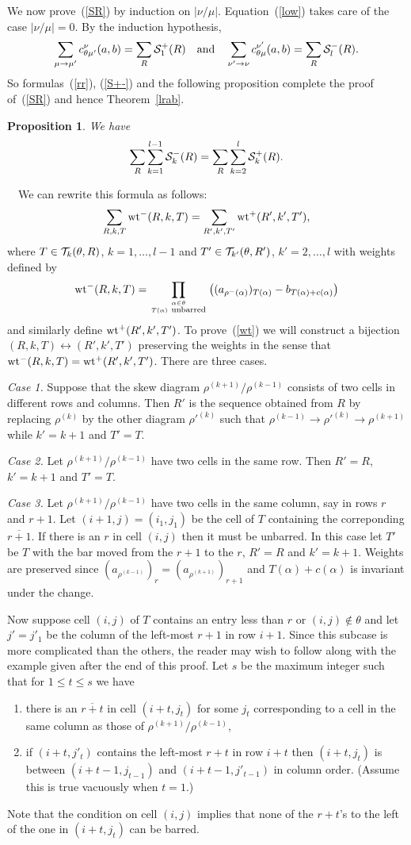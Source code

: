 \documentclass[titlepage,12pt]{article}
\newcommand{\ben}{\begin{enumerate}}
\newcommand{\een}{\end{enumerate}}
\newcommand{\bpr}{\begin{prop}}
\newcommand{\epr}{\end{prop}}
\newcommand{\beq}{\begin{equation}}
\newcommand{\eeq}{\end{equation}}
\newcommand{\ol}{\overline}
\newcommand{\qmq}[1]{\quad\mbox{#1}\quad}
\newcommand{\al}{\alpha}
\renewcommand{\th}{\theta}
\newcommand{\0}{{\bf 0}}
\newcommand{\1}{{\bf 1}}
\newcommand{\2}{{\bf 2}}
\newcommand{\3}{{\bf 3}}
\newcommand{\4}{{\bf 4}}
\newcommand{\5}{{\bf 5}}
\newcommand{\6}{{\bf 6}}
\newcommand{\7}{{\bf 7}}
\newcommand{\8}{{\bf 8}}
\newcommand{\9}{{\bf 9}}
\newcommand{\cS}{{\cal S}}
\newcommand{\cT}{{\cal T}}
\newcommand{\wt}{\mathop{\rm wt}\nolimits}
\newcommand{\Proof}{\noindent{\bf Proof.}\ \ }
\newtheorem{prop}[thm]{Proposition}
\begin{document}
We now prove~(\ref{SR}) by induction on $|\nu/\mu|$.
Equation~(\ref{low}) takes care of the case $|\nu/\mu|=0$.
By the induction hypothesis,
$$
\sum_{\mu\to\mu'}c_{\theta\mu'}^{\nu}(a,b)=\sum_R \cS_1^{+}(R)
\qmq{and}
\sum_{\nu'\to\nu}c_{\theta\mu}^{\nu'}(a,b)=\sum_R \cS_l^{-}(R).
$$
So formulas~(\ref{rr}), (\ref{S+-}) and 
the following proposition complete the proof of~(\ref{SR}) and hence
Theorem~\ref{lrab}. 

\bpr
We have
$$
\sum_R \sum_{k=1}^{l-1}\cS_k^{-}(R)=\sum_R \sum_{k=2}^l\cS_k^{+}(R).
$$
\epr

\Proof We can rewrite this formula as follows:
\beq						\label{wt}
\sum_{R,k,T}\wt^{-}(R,k,T)=\sum_{R',k',T'}\wt^{+}(R',k',T'),
\eeq
where $T\in\cT_k(\theta,R)$, $k=1,\dots,l-1$ and
$T'\in\cT_{k'}(\theta,R')$, $k'=2,\dots,l$ with weights defined by
$$
\wt^-(R,k,T)=
\prod_{\alpha\in\theta\atop T(\alpha)\ \mbox{\scriptsize unbarred}}
\left((a_{\rho^{-}(\alpha)})_{T(\alpha)}-b_{T(\alpha)+c(\alpha)}\right)
$$
and similarly define $\wt^+(R',k',T')$.  To prove~(\ref{wt})
we will construct a bijection $(R,k,T)\longleftrightarrow (R',k',T')$
preserving the weights in the sense that
$\wt^{-}(R,k,T)=\wt^{+}(R',k',T')$.
There are three cases.
\medskip

{\sl Case 1.}
Suppose that the skew diagram $\rho^{(k+1)}/\rho^{(k-1)}$ consists of
two cells in different rows and columns. Then $R'$ is the sequence
obtained from $R$ by replacing $\rho^{(k)}$ by the other diagram 
${\rho'}^{(k)}$ such that $\rho^{(k-1)}\to {\rho'}^{(k)}\to \rho^{(k+1)}$
while $k'=k+1$ and $T'=T$.
\medskip

{\sl Case 2.}
Let $\rho^{(k+1)}/\rho^{(k-1)}$ have two cells in the same row.
Then $R'=R$, $k'=k+1$ and $T'=T$.
\medskip

{\sl Case 3.}
Let $\rho^{(k+1)}/\rho^{(k-1)}$ have two cells in the same
column, say in rows $r$ and $r+1$.  Let $(i+1,j)=(i_1,j_1)$ be the cell
of $T$ containing the correponding $\ol{r+1}$.  If there is an $r$ in
cell $(i,j)$ then it must be unbarred.  In this case let $T'$ be $T$
with the bar moved from the $r+1$ to the $r$, $R'=R$ and $k'=k+1$.  Weights
are preserved since $(a_{\rho^{(k-1)}})_r=(a_{\rho^{(k+1)}})_{r+1}$ and
$T(\al)+c(\al)$ is invariant under the change.

Now suppose cell $(i,j)$ of $T$ contains an entry  less than $r$
or $(i,j)\not\in\th$ and
let $j'=j'_1$ be the column of the left-most $r+1$ in row $i+1$. 
Since this subcase is more complicated than the others, the reader may
wish to follow along with the example given after the end of this proof.
Let $s$ be the maximum integer such that for $1\le t\le s$ we have
\ben
\item there is an $\ol{r+t}$ in cell $(i+t,j_t)$ for some $j_t$
corresponding to a 
cell in the same column as those of $\rho^{(k+1)}/\rho^{(k-1)}$,
\item if $(i+t,j'_t)$ contains the left-most $r+t$ in row $i+t$ then
$(i+t,j_t)$ is between $(i+t-1,j_{t-1})$ and $(i+t-1,j'_{t-1})$ in
column order.  (Assume this is true vacuously when $t=1$.)
\een
Note that the condition on cell $(i,j)$ implies that none of the
$r+t$'s to the left of the one in $(i+t,j_t)$ can be barred.  
\end{document}

